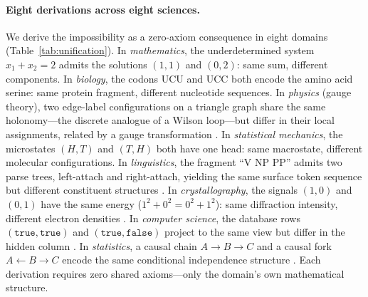 \documentclass[11pt]{article}
\begin{document}
\paragraph{Eight derivations across eight sciences.}
We derive the impossibility as a zero-axiom consequence in eight domains
(Table~\ref{tab:unification}).
%
In \emph{mathematics}, the underdetermined system $x_1 + x_2 = 2$ admits
the solutions $(1,1)$ and $(0,2)$: same sum, different components.
%
In \emph{biology}, the codons UCU and UCC both encode the amino acid
serine: same protein fragment, different nucleotide sequences.
%
In \emph{physics} (gauge theory), two edge-label configurations on a
triangle graph share the same holonomy---the discrete analogue of a Wilson
loop---but differ in their local assignments, related by a gauge
transformation \citep{jackson1999}.
%
In \emph{statistical mechanics}, the microstates $(H,T)$ and $(T,H)$ both
have one head: same macrostate, different molecular configurations.
%
In \emph{linguistics}, the fragment ``V NP PP'' admits two parse trees,
left-attach and right-attach, yielding the same surface token sequence but
different constituent structures \citep{chomsky1957}.
%
In \emph{crystallography}, the signals $(1,0)$ and $(0,1)$ have the same
energy ($1^2 + 0^2 = 0^2 + 1^2$): same diffraction intensity, different
electron densities \citep{hauptman1953solution}.
%
In \emph{computer science}, the database rows $(\texttt{true},
\texttt{true})$ and $(\texttt{true}, \texttt{false})$ project to the same
view but differ in the hidden column \citep{bancilhon1981update}.
%
In \emph{statistics}, a causal chain $A \to B \to C$ and a causal fork
$A \leftarrow B \to C$ encode the same conditional independence structure
\citep{verma1991equivalence}.
%
Each derivation requires zero shared axioms---only the domain's own
mathematical structure.
\end{document}
